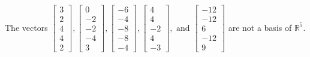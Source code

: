 \begin{exercise}
\begin{exerciseStatement}
  \end{exerciseStatement}
  \begin{exerciseAnswer}
   The vectors \(\left[\begin{array}{r}
3 \\
2 \\
4 \\
4 \\
2
\end{array}\right] , \left[\begin{array}{r}
0 \\
-2 \\
-2 \\
-4 \\
3
\end{array}\right] , \left[\begin{array}{r}
-6 \\
-4 \\
-8 \\
-8 \\
-4
\end{array}\right] , \left[\begin{array}{r}
4 \\
4 \\
-2 \\
4 \\
-3
\end{array}\right] , \text{ and } \left[\begin{array}{r}
-12 \\
-12 \\
6 \\
-12 \\
9
\end{array}\right]\) 
  	 are not  a basis of \(\mathbb{R}^5\).
  


  \end{exerciseAnswer}
\end{exercise}